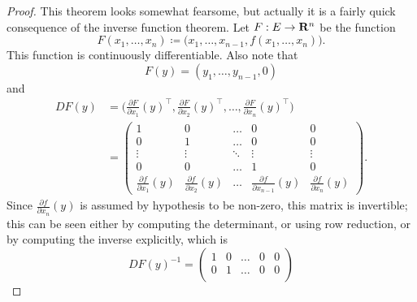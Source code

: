 \begin{proof}
    This theorem looks somewhat fearsome, but actually it is a fairly quick consequence of the inverse function theorem.
    Let \(F : E \to \mathbf{R}^n\) be the function
    \[
        F(x_1, \dots, x_n) \coloneqq \big(x_1, \dots, x_{n - 1}, f(x_1, \dots, x_n)\big).
    \]
    This function is continuously differentiable.
    Also note that
    \[
        F(y) = (y_1, \dots, y_{n - 1}, 0)
    \]
    and
    \begin{align*}
        D F(y) & = \bigg(\frac{\partial F}{\partial x_1}(y)^\top, \frac{\partial F}{\partial x_2}(y)^\top, \dots, \frac{\partial F}{\partial x_n}(y)^\top\bigg)                                         \\
               & = \begin{pmatrix}
                       1                                  & 0                                  & \dots  & 0                                        & 0                                  \\
                       0                                  & 1                                  & \dots  & 0                                        & 0                                  \\
                       \vdots                             & \vdots                             & \ddots & \vdots                                   & \vdots                             \\
                       0                                  & 0                                  & \dots  & 1                                        & 0                                  \\
                       \frac{\partial f}{\partial x_1}(y) & \frac{\partial f}{\partial x_2}(y) & \dots  & \frac{\partial f}{\partial x_{n - 1}}(y) & \frac{\partial f}{\partial x_n}(y)
                   \end{pmatrix}.
    \end{align*}
    Since \(\frac{\partial f}{\partial x_n}(y)\) is assumed by hypothesis to be non-zero, this matrix is invertible;
    this can be seen either by computing the determinant, or using row reduction, or by computing the inverse explicitly, which is
    \[
        D F(y)^{-1} = \begin{pmatrix}
            1                                       & 0                                       & \dots  & 0                                             & 0      \\
            0                                       & 1                                       & \dots  & 0                                             & 0      \\

\end{pmatrix}\]
\end{proof}
